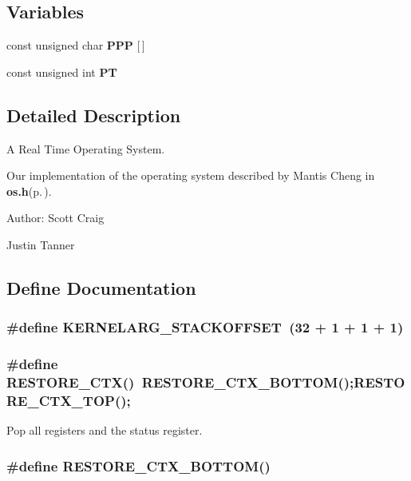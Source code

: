\subsection*{Variables}
\begin{CompactItemize}
\item 
const unsigned char {\bf PPP} [$\,$]
\item 
const unsigned int {\bf PT}
\end{CompactItemize}


\subsection{Detailed Description}
A Real Time Operating System. 

Our implementation of the operating system described by Mantis Cheng in {\bf os.h}{\rm (p.\,\pageref{os_8h})}.

\begin{Desc}
\item[Author:]Scott Craig 

Justin Tanner \end{Desc}


\subsection{Define Documentation}
\subsubsection{\setlength{\rightskip}{0pt plus 5cm}\#define KERNELARG\_\-STACKOFFSET~(32 + 1 + 1 + 1)}\label{os_8c_4ca901a3c767870093be57d271afc51e}


\subsubsection{\setlength{\rightskip}{0pt plus 5cm}\#define RESTORE\_\-CTX()~RESTORE\_\-CTX\_\-BOTTOM();RESTORE\_\-CTX\_\-TOP();}\label{os_8c_a48fc0927da8c8abbe88e67573b389c9}


Pop all registers and the status register. 

\subsubsection{\setlength{\rightskip}{0pt plus 5cm}\#define RESTORE\_\-CTX\_\-BOTTOM()}\label{os_8c_6002f8099b24e6c7903df21a754f1d6b}


